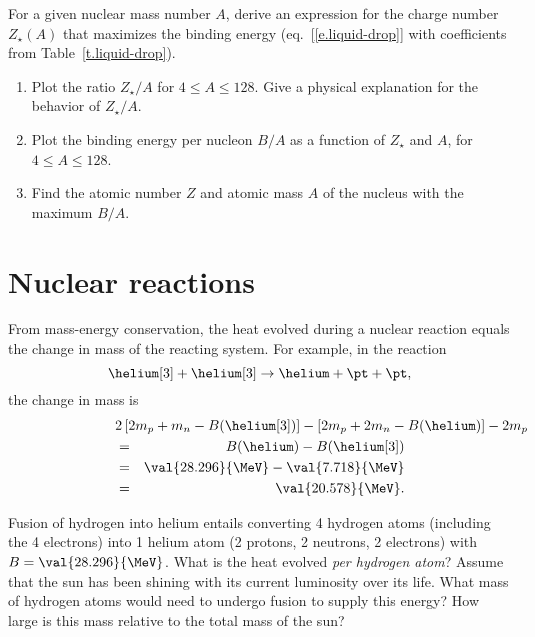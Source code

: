 \begin{exercisebox}
For a given nuclear mass number $A$, derive an expression for the charge number $Z_{\star}(A)$ that maximizes the binding energy (eq.~[\ref{e.liquid-drop}] with coefficients from Table~\ref{t.liquid-drop}).
\begin{enumerate}
\item Plot the ratio $Z_{\star}/A$ for $4\le A\le 128$. Give a physical explanation for the behavior of $Z_{\star}/A$.
\item Plot the binding energy per nucleon $B/A$ as a function of $Z_{\star}$ and $A$, for $4\le A\le 128$.
\item Find the atomic number $Z$ and atomic mass $A$ of the nucleus with the maximum $B/A$.
\end{enumerate}
\end{exercisebox}

\section{Nuclear reactions}

From mass-energy conservation, the heat evolved during a nuclear reaction equals the change in mass of the reacting system. For example, in the reaction
\[
	\helium[3] + \helium[3] \to \helium + \pt + \pt,
\]
the change in mass is
\begin{eqnarray*}
	\lefteqn{2\left[2m_{p}+m_{n}-B(\helium[3])\right] - \left[2m_{p}+2m_{n}-B(\helium)\right] - 2m_{p}} \\
	&=& B(\helium)-B(\helium[3])\\
	&=& \val{28.296}{\MeV} - \val{7.718}{\MeV}\\ &=& \val{20.578}{\MeV}.
\end{eqnarray*}

\begin{exercisebox}
Fusion of hydrogen into helium entails converting 4 hydrogen atoms (including the 4 electrons) into 1 helium atom (2 protons, 2 neutrons, 2 electrons) with $B = \val{28.296}{\MeV}$. What is the heat evolved \emph{per hydrogen atom}? Assume that the sun has been shining with its current luminosity over its life. What mass of hydrogen atoms would need to undergo fusion to supply this energy? How large is this mass relative to the total mass of the sun? 
\end{exercisebox}

